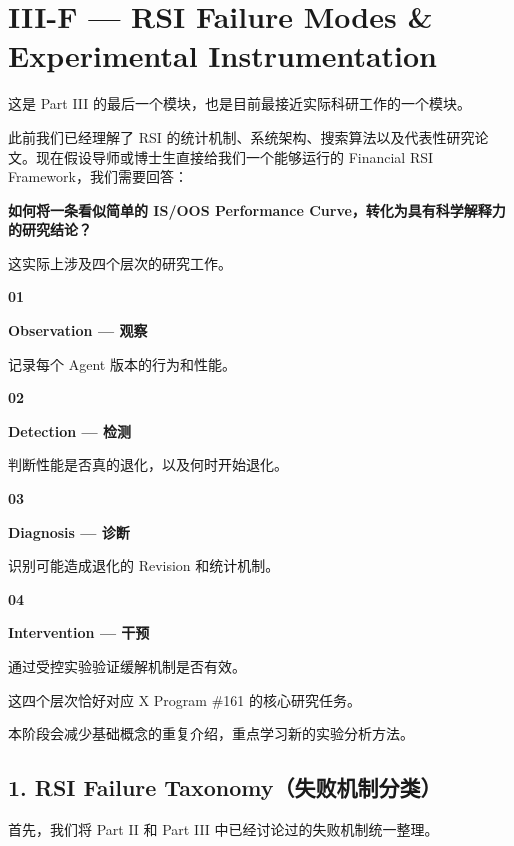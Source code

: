 \hypertarget{part-3-48-0001-iii-f-rsi-failure-modes-experimental-instrumentation}{%
\section{III-F --- RSI Failure Modes \& Experimental Instrumentation}\label{part-3-48-0001-iii-f-rsi-failure-modes-experimental-instrumentation}}

这是 Part III 的最后一个模块，也是目前最接近实际科研工作的一个模块。

此前我们已经理解了 RSI 的统计机制、系统架构、搜索算法以及代表性研究论文。现在假设导师或博士生直接给我们一个能够运行的 Financial RSI Framework，我们需要回答：

\textbf{如何将一条看似简单的 IS/OOS Performance Curve，转化为具有科学解释力的研究结论？}

这实际上涉及四个层次的研究工作。

\textbf{01}

\textbf{Observation --- 观察}

记录每个 Agent 版本的行为和性能。

\textbf{02}

\textbf{Detection --- 检测}

判断性能是否真的退化，以及何时开始退化。

\textbf{03}

\textbf{Diagnosis --- 诊断}

识别可能造成退化的 Revision 和统计机制。

\textbf{04}

\textbf{Intervention --- 干预}

通过受控实验验证缓解机制是否有效。

这四个层次恰好对应 X Program \#161 的核心研究任务。

本阶段会减少基础概念的重复介绍，重点学习新的实验分析方法。

\hypertarget{part-3-48-0001-rsi-failure-taxonomyux5931ux8d25ux673aux5236ux5206ux7c7b}{%
\subsection{1. RSI Failure Taxonomy（失败机制分类）}\label{part-3-48-0001-rsi-failure-taxonomyux5931ux8d25ux673aux5236ux5206ux7c7b}}

首先，我们将 Part II 和 Part III 中已经讨论过的失败机制统一整理。

